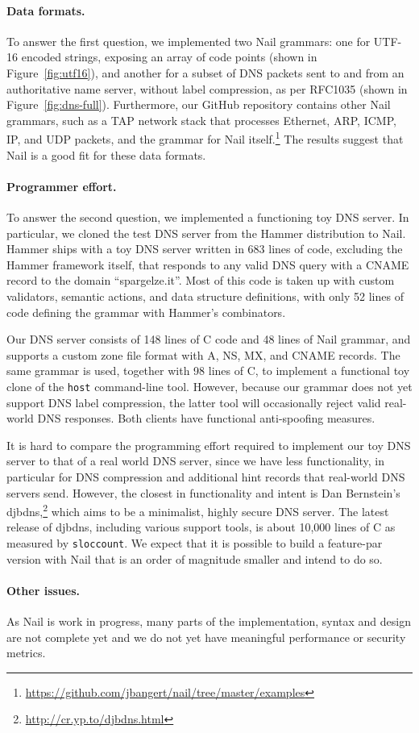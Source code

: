 \paragraph{Data formats.}

To answer the first question, we implemented two Nail grammars:
one for UTF-16 encoded strings, exposing an array of code points
(shown in Figure~\ref{fig:utf16}), and another for a subset of DNS
packets sent to and from an authoritative name server, without label
compression, as per RFC1035 (shown in Figure~\ref{fig:dns-full}).
Furthermore, our GitHub repository contains other Nail
grammars, such as a TAP network stack that processes Ethernet,
ARP, ICMP, IP, and UDP packets, and the grammar for Nail
itself.\footnote{\url{https://github.com/jbangert/nail/tree/master/examples}}
The results suggest that Nail is a good fit for these data formats.


\paragraph{Programmer effort.}

To answer the second question, we implemented a functioning toy DNS
server.  In particular, we cloned the test DNS server from the Hammer
distribution to Nail.  Hammer ships with a toy DNS server written in 683
lines of code, excluding the Hammer framework itself, that responds to
any valid DNS query with a CNAME record to the domain ``spargelze.it''.
Most of this code is taken up with custom validators, semantic actions,
and data structure definitions, with only 52 lines of code defining the
grammar with Hammer's combinators.

Our DNS server consists of 148 lines of C code and 48 lines of Nail
grammar, and supports a custom zone file format with A, NS, MX, and
CNAME records. The same grammar is used, together with 98 lines of C,
to implement a functional toy clone of the \texttt{host} command-line
tool. However, because our grammar does not yet support DNS label
compression, the latter tool will occasionally reject valid real-world
DNS responses. Both clients have functional anti-spoofing measures.

It is hard to compare the programming effort required to implement
our toy DNS server to that of a real world DNS server, since
we have less functionality, in particular for DNS compression
and additional hint records that real-world DNS servers send.
However, the closest in functionality and intent is Dan Bernstein's
djbdns,\footnote{\url{http://cr.yp.to/djbdns.html}} which aims to be
a minimalist, highly secure DNS server. The latest release of djbdns,
including various support tools, is about 10,000 lines of C as measured by
\texttt{sloccount}.  We expect that it is possible to build a feature-par
version with Nail that is an order of magnitude smaller and intend to
do so.


\paragraph{Other issues.}

As Nail is work in progress, many parts of the implementation, syntax and
design are not complete yet and we do not yet have meaningful performance
or security metrics.

